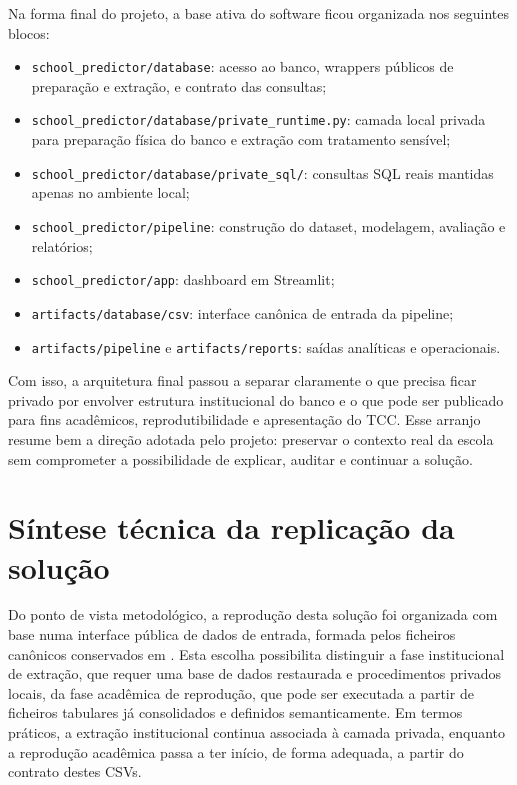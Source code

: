 Na forma final do projeto, a base ativa do software ficou organizada nos seguintes blocos:
\begin{itemize}
    \item \texttt{school\_predictor/database}: acesso ao banco, wrappers p\'ublicos de prepara\c{c}\~ao e extra\c{c}\~ao, e contrato das consultas;
    \item \texttt{school\_predictor/database/private\_runtime.py}: camada local privada para prepara\c{c}\~ao f\'isica do banco e extra\c{c}\~ao com tratamento sens\'ivel;
    \item \texttt{school\_predictor/database/private\_sql/}: consultas SQL reais mantidas apenas no ambiente local;
    \item \texttt{school\_predictor/pipeline}: constru\c{c}\~ao do dataset, modelagem, avalia\c{c}\~ao e relat\'orios;
    \item \texttt{school\_predictor/app}: dashboard em Streamlit;
    \item \texttt{artifacts/database/csv}: interface can\^onica de entrada da pipeline;
    \item \texttt{artifacts/pipeline} e \texttt{artifacts/reports}: sa\'idas anal\'iticas e operacionais.
\end{itemize}

Com isso, a arquitetura final passou a separar claramente o que precisa ficar privado por envolver estrutura institucional do banco e o que pode ser publicado para fins acad\^emicos, reprodutibilidade e apresenta\c{c}\~ao do TCC. Esse arranjo resume bem a dire\c{c}\~ao adotada pelo projeto: preservar o contexto real da escola sem comprometer a possibilidade de explicar, auditar e continuar a solu\c{c}\~ao.

\section{S\'intese t\'ecnica da replica\c{c}\~ao da solu\c{c}\~ao}
\label{sec:sintese-replicacao-tecnica}

Do ponto de vista metodol\'ogico, a reprodu\c{c}\~ao desta solu\c{c}\~ao foi organizada com base numa interface p\'ublica de dados de entrada, formada pelos ficheiros can\^onicos conservados em . Esta escolha possibilita distinguir a fase institucional de extra\c{c}\~ao, que requer uma base de dados restaurada e procedimentos privados locais, da fase acad\^emica de reprodu\c{c}\~ao, que pode ser executada a partir de ficheiros tabulares j\'a consolidados e definidos semanticamente. Em termos pr\'aticos, a extra\c{c}\~ao institucional continua associada \`a camada privada, enquanto a reprodu\c{c}\~ao acad\^emica passa a ter in\'icio, de forma adequada, a partir do contrato destes CSVs.

